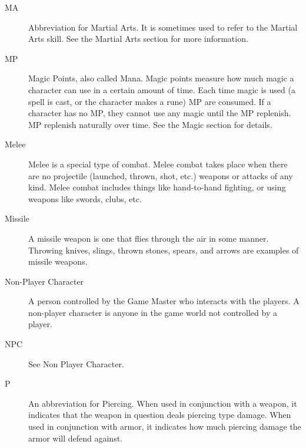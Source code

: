 \documentclass[twoside]{book}
\begin{document}
\begin{description}
{    }
  
  \item[ MA ] 
    {  
      Abbreviation for Martial Arts. It is sometimes
                 used to refer to the Martial Arts skill. See the Martial
                 Arts section for more information. 
    }
  
  \item[ MP ] 
    {  
      Magic Points, also called Mana. Magic points
                 measure how much magic a character can use in a certain
                 amount of time. Each time magic is used (a spell is
                 cast, or the character makes a rune) MP are consumed. If
                 a character has no MP, they cannot use any magic until
                 the MP replenish. MP replenish naturally over time. See
                 the Magic section for details. 
    }
  
  \item[ Melee ] 
    {  
      Melee is a special type of combat. Melee combat
                 takes place when there are no projectile (launched,
                 thrown, shot, etc.) weapons or attacks of any kind.
                 Melee combat includes things like hand-to-hand fighting,
                 or using weapons like swords, clubs, etc. 
    }
  
  \item[ Missile ] 
    {  
      A missile weapon is one that flies through the
                 air in some manner. Throwing knives, slings, thrown
                 stones, spears, and arrows are examples of missile
                 weapons. 
    }
  
  \item[ Non-Player Character ] 
    {  
      A person controlled by the Game Master who
                 interacts with the players. A non-player character is
                 anyone in the game world not controlled by a player.
                 
    }
  
  \item[ NPC ] 
    {  
      See Non Player Character. 
    }
  
  \item[ P ] 
    {  
      An abbreviation for Piercing. When used in
                 conjunction with a weapon, it indicates that the weapon
                 in question deals piercing type damage. When used in
                 conjunction with armor, it indicates how much piercing
                 damage the armor will defend against. 
    }
  

\end{description}
\end{document}
